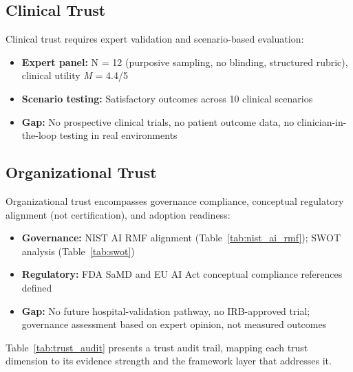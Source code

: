 \subsection{Clinical Trust}

Clinical trust requires expert validation and scenario-based evaluation:

\begin{itemize}
    \item \textbf{Expert panel:} N = 12 (purposive sampling, no blinding, structured rubric), clinical utility \textit{M} = 4.4/5
    \item \textbf{Scenario testing:} Satisfactory outcomes across 10 clinical scenarios
    \item \textbf{Gap:} No prospective clinical trials, no patient outcome data, no clinician-in-the-loop testing in real environments
\end{itemize}

\subsection{Organizational Trust}

Organizational trust encompasses governance compliance, conceptual regulatory alignment (not certification), and adoption readiness:

\begin{itemize}
    \item \textbf{Governance:} NIST AI RMF alignment (Table~\ref{tab:nist_ai_rmf}); SWOT analysis (Table~\ref{tab:swot})
    \item \textbf{Regulatory:} FDA SaMD and EU AI Act conceptual compliance references defined
    \item \textbf{Gap:} No future hospital-validation pathway, no IRB-approved trial; governance assessment based on expert opinion, not measured outcomes
\end{itemize}
\fi

\noindent Table~\ref{tab:trust_audit} presents a trust audit trail, mapping each trust dimension to its evidence strength and the framework layer that addresses it.



